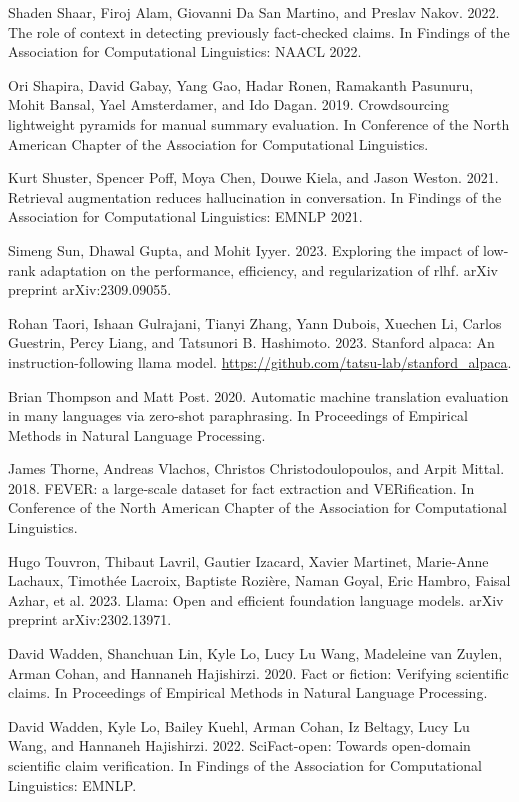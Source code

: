 \documentclass[11pt,UTF8,fontset=fandol]{ctexart}
\begin{document}
Shaden Shaar, Firoj Alam, Giovanni Da San Martino, and Preslav Nakov. 2022. The role of context in detecting previously fact-checked claims. In Findings of the Association for Computational Linguistics: NAACL 2022.

Ori Shapira, David Gabay, Yang Gao, Hadar Ronen, Ramakanth Pasunuru, Mohit Bansal, Yael Amsterdamer, and Ido Dagan. 2019. Crowdsourcing lightweight pyramids for manual summary evaluation. In Conference of the North American Chapter of the Association for Computational Linguistics.

Kurt Shuster, Spencer Poff, Moya Chen, Douwe Kiela, and Jason Weston. 2021. Retrieval augmentation reduces hallucination in conversation. In Findings of the Association for Computational Linguistics: EMNLP 2021.

Simeng Sun, Dhawal Gupta, and Mohit Iyyer. 2023. Exploring the impact of low-rank adaptation on the performance, efficiency, and regularization of rlhf. arXiv preprint arXiv:2309.09055.

Rohan Taori, Ishaan Gulrajani, Tianyi Zhang, Yann Dubois, Xuechen Li, Carlos Guestrin, Percy Liang, and Tatsunori B. Hashimoto. 2023. Stanford alpaca: An instruction-following llama model. \url{https://github.com/tatsu-lab/stanford_alpaca}.

Brian Thompson and Matt Post. 2020. Automatic machine translation evaluation in many languages via zero-shot paraphrasing. In Proceedings of Empirical Methods in Natural Language Processing.

James Thorne, Andreas Vlachos, Christos Christodoulopoulos, and Arpit Mittal. 2018. FEVER: a large-scale dataset for fact extraction and VERification. In Conference of the North American Chapter of the Association for Computational Linguistics.

Hugo Touvron, Thibaut Lavril, Gautier Izacard, Xavier Martinet, Marie-Anne Lachaux, Timothée Lacroix, Baptiste Rozière, Naman Goyal, Eric Hambro, Faisal Azhar, et al. 2023. Llama: Open and efficient foundation language models. arXiv preprint arXiv:2302.13971.

David Wadden, Shanchuan Lin, Kyle Lo, Lucy Lu Wang, Madeleine van Zuylen, Arman Cohan, and Hannaneh Hajishirzi. 2020. Fact or fiction: Verifying scientific claims. In Proceedings of Empirical Methods in Natural Language Processing.

David Wadden, Kyle Lo, Bailey Kuehl, Arman Cohan, Iz Beltagy, Lucy Lu Wang, and Hannaneh Hajishirzi. 2022. SciFact-open: Towards open-domain scientific claim verification. In Findings of the Association for Computational Linguistics: EMNLP.
\end{document}
